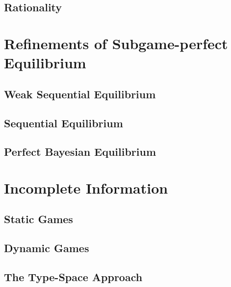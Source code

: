		\section{Rationality}

	\chapter{Refinements of Subgame-perfect Equilibrium}
		\section{Weak Sequential Equilibrium}

		\section{Sequential Equilibrium}

		\section{Perfect Bayesian Equilibrium}

	\chapter{Incomplete Information}
		\section{Static Games}

		\section{Dynamic Games}

		\section{The Type-Space Approach}